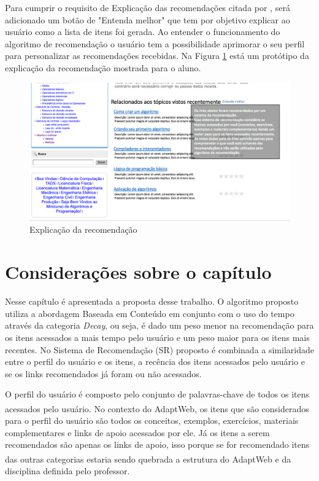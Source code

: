 Para cumprir o requisito de Explicação das recomendações citada por , será adicionado um
botão de "Entenda melhor" que tem por objetivo explicar ao usuário como a lista de itens foi gerada. Ao entender o
funcionamento do algoritmo de recomendação o usuário tem a possibilidade aprimorar o seu perfil para personalizar as
recomendações recebidas. Na Figura \ref{fig:adaptweb-proposta-explicacao} está um protótipo da explicação da recomendação
mostrada para o aluno.

\begin{figure}[htb]
  \caption{\label{fig:adaptweb-proposta-explicacao}Explicação da recomendação}
  \begin{center}
      \includegraphics[scale=0.6]{./Figuras/explicacoes_v2.png}
  \end{center}
\end{figure}

\section{Considerações sobre o capítulo}

Nesse capítulo é apresentada a proposta desse trabalho. O algoritmo proposto utiliza a abordagem Baseada em Conteúdo em
conjunto com o uso do tempo através da categoria \textit{Decay}, ou seja, é dado um peso menor na recomendação para os
itens acessados a mais tempo pelo usuário e um peso maior para os itens mais recentes. No Sistema de Recomendação (SR)
proposto é combinada a similaridade entre o perfil do usuário e os itens, a recência dos itens acessados pelo usuário e
se os links recomendados já foram ou não acessados.

O perfil do usuário é composto pelo conjunto de palavras-chave de todos os itens acessados pelo usuário. No contexto do
AdaptWeb\textsuperscript{\textregistered}, os itens que são considerados para o perfil do usuário são todos os conceitos,
exemplos, exercícios, materiais complementares e links de apoio acessados por ele. Já os itens a serem recomendados são
apenas os links de apoio, isso porque se for recomendado itens das outras categorias estaria sendo quebrada a estrutura
do AdaptWeb\textsuperscript{\textregistered} e da disciplina definida pelo professor.

